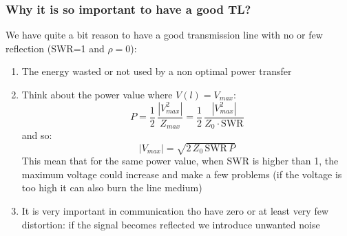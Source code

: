 \subsubsection*{Why it is so important to have a good TL?}
We have quite a bit reason to have a good transmission line with no or few reflection (SWR=1 and $\rho=0$):
\begin{enumerate}
    \item The energy wasted or not used by a non optimal power transfer
    \item Think about the power value where $V(l)=V_{max}$:
        \begin{equation*}
            P=\frac{1}{2}\,\frac{|V_{max}^2|}{Z_{max}}=\frac{1}{2}\,\frac{|V_{max}^2|}{Z_0\cdot \text{SWR}}{}
        \end{equation*}
        and so:
        \begin{equation}
            |V_{max}|=\sqrt{2\,Z_0\,\text{SWR}\,P}
        \end{equation}
        This mean that for the same power value, when SWR is higher than 1, the maximum voltage could increase and make a few problems (if the voltage is too high it can also burn the line medium)
    \item It is very important in communication tho have zero or at least very few distortion: if the signal becomes reflected we introduce unwanted noise
\end{enumerate}
